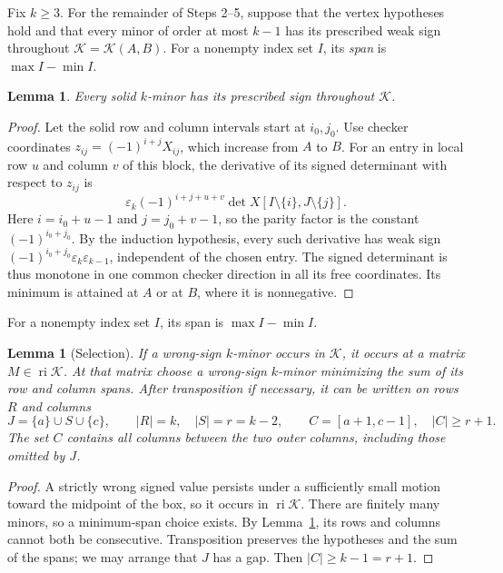 \documentclass[10pt,a4paper]{article}
\newtheorem{lemma}[theorem]{Lemma}
\theoremstyle{definition}
\theoremstyle{remark}
\numberwithin{equation}{section}
\newcommand{\eps}{\varepsilon}
\newcommand{\K}{\mathcal K}
\DeclareMathOperator{\ri}{ri}
\begin{document}
Fix $k\geq3$. For the remainder of Steps 2--5, suppose that the
vertex hypotheses hold and that every minor of order at most $k-1$ has
its prescribed weak sign throughout $\K=\K(A,B)$. For a nonempty index
set $I$, its \emph{span} is $\max I-\min I$.

\begin{lemma}\label{lem:solid}
Every solid $k$-minor has its prescribed sign throughout $\K$.
\end{lemma}

\begin{proof}
Let the solid row and column intervals start at $i_0,j_0$.
Use checker coordinates $z_{ij}=(-1)^{i+j}X_{ij}$, which
increase from $A$ to $B$. For an entry in local row $u$ and
column $v$ of this block, the derivative of its signed determinant
with respect to $z_{ij}$ is
\[
 \eps_k(-1)^{i+j+u+v}\det X[I\setminus\{i\},J\setminus\{j\}].
\]
Here $i=i_0+u-1$ and $j=j_0+v-1$, so the parity factor is the
constant $(-1)^{i_0+j_0}$. By the induction hypothesis, every
such derivative has weak sign
$(-1)^{i_0+j_0}\eps_k\eps_{k-1}$, independent of the chosen
entry. The signed determinant is thus monotone in one common
checker direction in all its free coordinates. Its minimum is
attained at $A$ or at $B$, where it is nonnegative.
\end{proof}

For a nonempty index set $I$, its span is $\max I-\min I$.

\begin{lemma}[Selection]\label{lem:select}
If a wrong-sign $k$-minor occurs in $\K$, it occurs at a matrix
$M\in\ri\K$. At that matrix choose a wrong-sign $k$-minor minimizing the
sum of its row and column spans. After transposition if necessary, it can
be written on rows $R$ and columns
\begin{equation}\label{eq:JSC}
 J=\{a\}\cup S\cup\{c\},\qquad |R|=k,\quad |S|=r=k-2,\qquad
 C=[a+1,c-1],\quad |C|\geq r+1 .
\end{equation}
The set $C$ contains all columns between the two outer columns,
including those omitted by $J$.
\end{lemma}

\begin{proof}
A strictly wrong signed value persists under a sufficiently small motion
toward the midpoint of the box, so it occurs in $\ri\K$. There are
finitely many minors, so a minimum-span choice exists. By
Lemma~\ref{lem:solid}, its rows and columns cannot both be consecutive.
Transposition preserves the hypotheses and the sum of the spans; we may
arrange that $J$ has a gap. Then $|C|\geq k-1=r+1$.
\end{proof}
\end{document}
